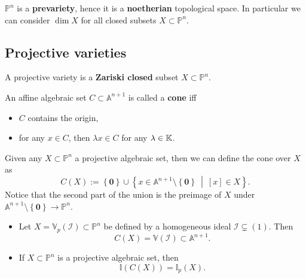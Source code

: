 \begin{rem}
	$\mathbb{P}^n$ is a \textbf{prevariety}, hence it is a \textbf{noetherian} topological space.
	In particular we can consider $\dim X$ for all closed subsets $X \subset \mathbb{P}^n$.
\end{rem} 

\subsection{Projective varieties}
\begin{defn}
	A projective variety is a \textbf{Zariski closed} subset $X \subset \mathbb{P}^n$.
\end{defn}

\begin{defn}[Cone]
	An affine algebraic set $C \subset \mathbb{A}^{n+1}$ is called a \textbf{cone} iff 
	\begin{itemize}
		\item $C$ contains the origin,
		\item for any $x \in C$, then $\lambda x \in C$ for any $\lambda \in \mathbb{K}$.
	\end{itemize}
\end{defn}

\begin{defn}
	Given any $X \subset \mathbb{P}^n$ a projective algebraic set, then we can define the cone over $X$ as
	\begin{equation}
		C(X) := \left\{ \mathbf{0} \right\} \cup \left\{ x \in \mathbb{A}^{n+1}\setminus \left\{ \mathbf{0} \right\} \ \middle|\ \left[ x \right] \in X \right\}
	.\end{equation} 
	Notice that the second part of the union is the preimage of $X$ under $\mathbb{A}^{n+1}\setminus \left\{ \mathbf{0} \right\} \to \mathbb{P}^{n}$.
\end{defn}

\begin{lem}\leavevmode\vspace{-.2\baselineskip}
	\begin{itemize}
		\item Let $X = \mathbb{V}_p\left( \mathcal{I} \right) \subset \mathbb{P}^{n}$ be defined by a homogeneous ideal $\mathcal{I} \subsetneq \left( 1 \right)$.
			Then 
			\begin{equation}
			C(X) = \mathbb{V}\left( \mathcal{I} \right) \subset \mathbb{A}^{n+1}
			.\end{equation}
		\item If $X \subset \mathbb{P}^{n}$ is a projective algebraic set, then
			\begin{equation}
				\mathbb{I}\left( C(X) \right) = \mathbb{I}_p(X)
			.\end{equation} 
	\end{itemize}
\end{lem} 

